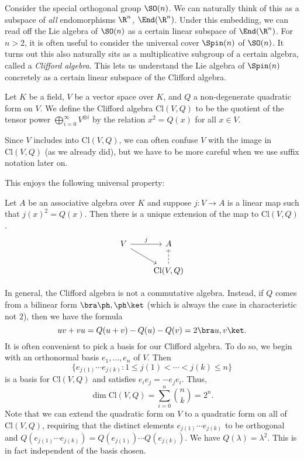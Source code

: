 \documentclass[a4paper]{article}
\newcommand\Cl{\mathrm{Cl}}
\begin{document}
Consider the special orthogonal group $\SO(n)$. We can naturally think of this as a subspace of \emph{all} endomorphisms $\R^n$, $\End(\R^n)$. Under this embedding, we can read off the Lie algebra of $\SO(n)$ as a certain linear subspace of $\End(\R^n)$. For $n > 2$, it is often useful to consider the universal cover $\Spin(n)$ of $\SO(n)$. It turns out this also naturally sits as a multiplicative subgroup of a certain algebra, called a \emph{Clifford algebra}. This lets us understand the Lie algebra of $\Spin(n)$ concretely as a certain linear subspace of the Clifford algebra.

\begin{defi}
  Let $K$ be a field, $V$ be a vector space over $K$, and $Q$ a non-degenerate quadratic form on $V$. We define the Clifford algebra $\Cl(V, Q)$ to be the quotient of the tensor power $\bigoplus_{i = 0}^\infty V^{\otimes i}$ by the relation $x^2 = Q(x)$ for all $x \in V$.
\end{defi}
Since $V$ includes into $\Cl(V, Q)$, we can often confuse $V$ with the image in $\Cl(V, Q)$ (as we already did), but we have to be more careful when we use suffix notation later on.

This enjoys the following universal property:
\begin{prop}
  Let $A$ be an associative algebra over $K$ and suppose $j: V \to A$ is a linear map such that $j(x)^2 = Q(x)$. Then there is a unique extension of the map to $\Cl(V, Q)$.
  \[
    \begin{tikzcd}
      V \ar[r, "j"] \ar[rd] & A\\
      & \Cl(V, Q) \ar[u, dashed]
    \end{tikzcd}
  \]
\end{prop}

In general, the Clifford algebra is not a commutative algebra. Instead, if $Q$ comes from a bilinear form $\bra \ph, \ph \ket$ (which is always the case in characteristic not $2$), then we have the formula
\[
  uv + vu = Q(u + v) - Q(u) - Q(v) = 2 \bra u, v\ket.
\]
It is often convenient to pick a basis for our Clifford algebra. To do so, we begin with an orthonormal basis $e_1, \ldots, e_n$ of $V$. Then
\[
  \{e_{j(1)} \cdots e_{j(k)} : 1 \leq j(1) < \cdots < j(k) \leq n\}
\]
is a basis for $\Cl(V, Q)$ and satisfies $e_i e_j = - e_j e_i$. Thus,
\[
  \dim \Cl(V, Q) = \sum_{i = 0}^n \binom{n}{k} = 2^n.
\]
Note that we can extend the quadratic form on $V$ to a quadratic form on all of $\Cl(V, Q)$, requiring that the distinct elements $e_{j(1)} \cdots e_{j(k)}$ to be orthogonal and $Q(e_{j(1)} \cdots e_{j(k)}) = Q(e_{j(1)}) \cdots Q(e_{j(k)})$. We have $Q(\lambda) = \lambda^2$. This is in fact independent of the basis chosen.
\end{document}
